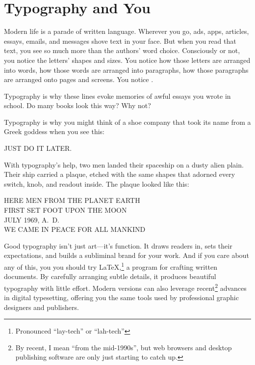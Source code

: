 \chapter{Typography and You}
\label{typography}

Modern life is a parade of written language.
Wherever you go,
ads, apps, articles, essays, emails, and messages
shove text in your face.
But when you read that text, you see so much more than the authors' word choice.
Consciously or not, you notice the letters' shapes and sizes.
You notice how those letters are arranged into words,
how those words are arranged into paragraphs,
how those paragraphs are arranged onto pages and screens.
You notice .
\begin{leftfigure}
\fontsize{12bp}{24bp}\selectfont\raggedright
Typography is why these lines evoke memories of awful essays
you wrote in school.
Do many books look this way? Why not?
\end{leftfigure}
\medskip

\noindent Typography is why you might think of a shoe company that took
its name from a Greek goddess when you see this:
\begin{leftfigure}
\Large JUST DO IT LATER.
\end{leftfigure}
With typography's help, two men landed their spaceship on a dusty alien plain.
Their ship carried a plaque, etched with the same shapes that adorned every
switch, knob, and readout inside. The plaque looked like this:
\begin{center}
HERE MEN FROM THE PLANET EARTH \\
FIRST SET FOOT UPON THE MOON \\
JULY 1969, A.~D. \\
WE CAME IN PEACE FOR ALL MANKIND
\end{center}

Good typography isn't just art---it's function.
It draws readers in,
sets their expectations, and builds a subliminal brand for your
work.\punckern{}
And if you care about any of this,
you you should try \LaTeX,\punckern\footnote{Pronounced ``lay-tech''
or ``lah-tech''}
a program for crafting written documents.
By carefully arranging subtle details,
it produces beautiful typography with little effort.
Modern versions can also leverage recent\footnote{By recent,
I mean ``from the mid-1990s''\quotekern, but web browsers and desktop publishing
software are only just starting to catch up.} advances in digital typesetting,
offering you the same tools used by professional graphic designers and
publishers.

